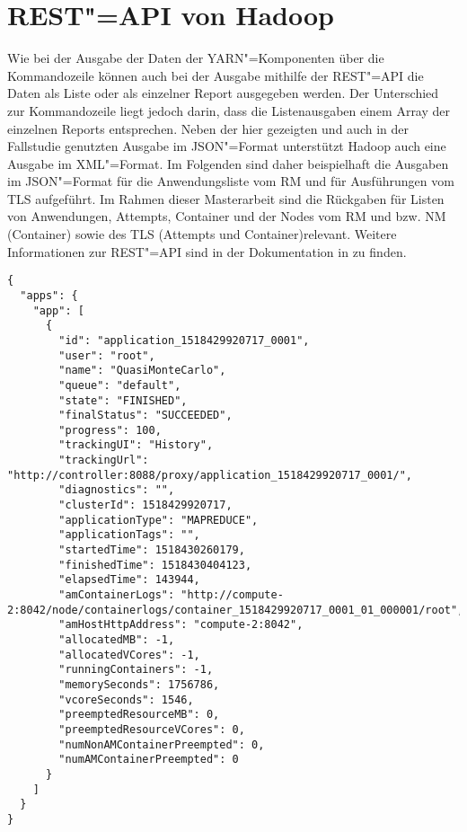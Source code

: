 \chapter{REST"=API von Hadoop}
\label{app:hadoopRestApi}

Wie bei der Ausgabe der Daten der YARN"=Komponenten über die Kommandozeile können auch bei der Ausgabe mithilfe der REST"=API die Daten als Liste oder als einzelner Report ausgegeben werden.
Der Unterschied zur Kommandozeile liegt jedoch darin, dass die Listenausgaben einem Array der einzelnen Reports entsprechen.
Neben der hier gezeigten und auch in der Fallstudie genutzten Ausgabe im JSON"=Format unterstützt Hadoop auch eine Ausgabe im XML"=Format.
Im Folgenden sind daher beispielhaft die Ausgaben im JSON"=Format für die Anwendungsliste vom \ac{RM} und für Ausführungen vom \ac{TLS} aufgeführt.
Im Rahmen dieser Masterarbeit sind die Rückgaben für Listen von Anwendungen, Attempts, Container und der Nodes vom \ac{RM} und bzw. \ac{NM} (Container) sowie des \ac{TLS} (Attempts und Container)relevant.
Weitere Informationen zur REST"=API sind in der Dokumentation in \cite{HadoopYarnTlServer271,HadoopRmApi271,HadoopNmApi271} zu finden.

\begin{lstlisting}[label=lst:hadoopAppListRestRm,style=cs,
caption={[REST"=-Ausgabe aller Anwendungen vom \acs{RM}]
    REST"=Ausgabe aller Anwendungen vom \ac{RM}.
    Die Liste kann mithilfe verschiedener Query"=Parameter gefiltert werden.\\
    URL: \url{http://addr:port/ws/v1/cluster/apps}}]
{
  "apps": {
    "app": [
      {
        "id": "application_1518429920717_0001",
        "user": "root",
        "name": "QuasiMonteCarlo",
        "queue": "default",
        "state": "FINISHED",
        "finalStatus": "SUCCEEDED",
        "progress": 100,
        "trackingUI": "History",
        "trackingUrl": "http://controller:8088/proxy/application_1518429920717_0001/",
        "diagnostics": "",
        "clusterId": 1518429920717,
        "applicationType": "MAPREDUCE",
        "applicationTags": "",
        "startedTime": 1518430260179,
        "finishedTime": 1518430404123,
        "elapsedTime": 143944,
        "amContainerLogs": "http://compute-2:8042/node/containerlogs/container_1518429920717_0001_01_000001/root",
        "amHostHttpAddress": "compute-2:8042",
        "allocatedMB": -1,
        "allocatedVCores": -1,
        "runningContainers": -1,
        "memorySeconds": 1756786,
        "vcoreSeconds": 1546,
        "preemptedResourceMB": 0,
        "preemptedResourceVCores": 0,
        "numNonAMContainerPreempted": 0,
        "numAMContainerPreempted": 0
      }
    ]
  }
}
\end{lstlisting}

